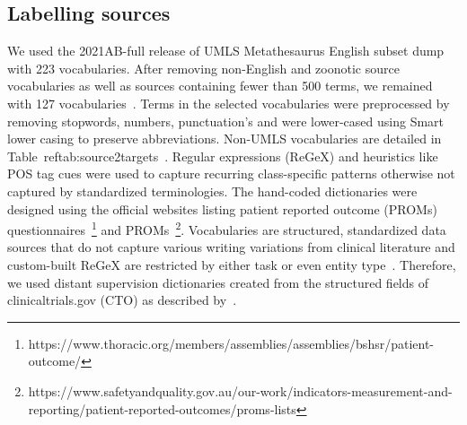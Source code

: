 \documentclass[10.7pt,]{article}
\begin{document}
\subsection{Labelling sources}\label{lss}
%
We used the 2021AB-full release of UMLS Metathesaurus English subset dump with 223 vocabularies.
After removing non-English and zoonotic source vocabularies as well as sources containing fewer than 500 terms, we remained with 127 vocabularies~\cite{humphreys1998unified}.
Terms in the selected vocabularies were preprocessed by removing stopwords, numbers, punctuation's and were lower-cased using Smart lower casing to preserve abbreviations.
Non-UMLS vocabularies are detailed in Table~ref{tab:source2targets}~\cite{schriml2012disease,robinson2008human,he2014oae,de2010chemical,lin2020cto,kronk2020development,geifman2011towards,rogier2021using,lin2018cancer,mohammed2012building,ninot2018definition}.
Regular expressions (ReGeX) and heuristics like POS tag cues were used to capture recurring class-specific patterns otherwise not captured by standardized terminologies.
The hand-coded dictionaries were designed using the official websites listing patient reported outcome (PROMs) questionnaires~\footnote{https://www.thoracic.org/members/assemblies/assemblies/bshsr/patient-outcome/} and PROMs~\footnote{https://www.safetyandquality.gov.au/our-work/indicators-measurement-and-reporting/patient-reported-outcomes/proms-lists}.
Vocabularies are structured, standardized data sources that do not capture various writing variations from clinical literature and custom-built ReGeX are restricted by either task or even entity type~\cite{ratner2017snorkel,safranchik2020weakly}.
Therefore, we used distant supervision dictionaries created from the structured fields of clinicaltrials.gov (CTO) as described by~\cite{dhrangadhariya2022distant}.
\end{document}
